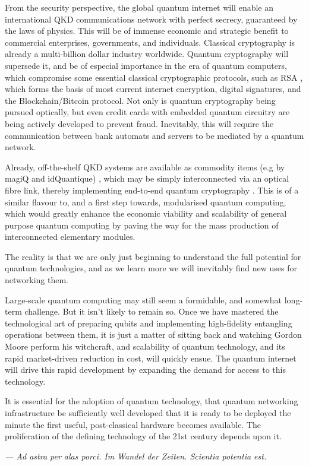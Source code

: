 \documentclass[aps,rmp,twocolumn,amsmath,amssymb,nofootinbib,superscriptaddress]{revtex4}
\newcommand{\comment}[1]{{\color{blue}{\textbf{#1}}}}
\begin{document}
From the security perspective, the global quantum internet will enable an international QKD communications network with perfect secrecy, guaranteed by the laws of physics. This will be of immense economic and strategic benefit to commercial enterprises, governments, and individuals. Classical cryptography is already a multi-billion dollar industry worldwide. Quantum cryptography will supersede it, and be of especial importance in the era of quantum computers, which compromise some essential classical cryptographic protocols, such as RSA \cite{bib:RSA}, which forms the basis of most current internet encryption, digital signatures, and the Blockchain/Bitcoin protocol. Not only is quantum cryptography being pursued optically, but even credit cards with embedded quantum circuitry are being actively developed to prevent fraud. Inevitably, this will require the communication between bank automats and servers to be mediated by a quantum network.

Already, off-the-shelf QKD systems are available as commodity items (e.g by magiQ and idQuantique) \comment{Check this. Are there others?}, which may be simply interconnected via an optical fibre link, thereby implementing end-to-end quantum cryptography \cite{???, IDQUANTIQUE, MAGICQ}. This is of a similar flavour to, and a first step towards, modularised quantum computing, which would greatly enhance the economic viability and scalability of general purpose quantum computing by paving the way for the mass production of interconnected elementary modules.

The reality is that we are only just beginning to understand the full potential for quantum technologies, and as we learn more we will inevitably find new uses for networking them.

Large-scale quantum computing may still seem a formidable, and somewhat long-term challenge. But it isn't likely to remain so. Once we have mastered the technological art of preparing qubits and implementing high-fidelity entangling operations between them, it is just a matter of sitting back and watching Gordon Moore perform his witchcraft, and scalability of quantum technology, and its rapid market-driven reduction in cost, will quickly ensue. The quantum internet will drive this rapid development by expanding the demand for access to this technology.

It is essential for the adoption of quantum technology, that quantum networking infrastructure be sufficiently well developed that it is ready to be deployed the minute the first useful, post-classical hardware becomes available. The proliferation of the defining technology of the 21st century depends upon it.

\emph{--- Ad astra per alas porci. Im Wandel der Zeiten. Scientia potentia est.}

%
%

\begin{acknowledgments}
\end{acknowledgments}

%
%


\end{document}
